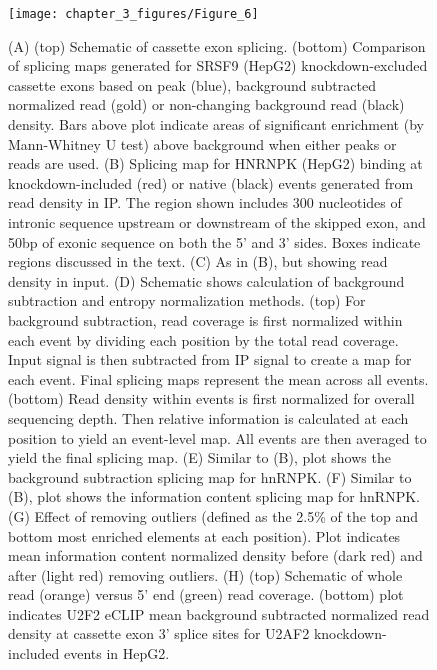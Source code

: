 \begin{figure}[ht]
  \centering
  \texttt{[image: chapter\_3\_figures/Figure\_6]}
  \caption[Figure 6. Considerations for design of splicing maps]{(A) (top) Schematic of cassette exon splicing. (bottom) Comparison of splicing maps generated for SRSF9 (HepG2) knockdown-excluded cassette exons based on peak (blue), background subtracted normalized read (gold) or non-changing background read (black) density. Bars above plot indicate areas of significant enrichment (by Mann-Whitney U test) above background when either peaks or reads are used. (B) Splicing map for HNRNPK (HepG2) binding at knockdown-included (red) or native (black) events generated from read density in IP. The region shown includes 300 nucleotides of intronic sequence upstream or downstream of the skipped exon, and 50bp of exonic sequence on both the 5’ and 3’ sides. Boxes indicate regions discussed in the text. (C) As in (B), but showing read density in input. (D) Schematic shows calculation of background subtraction and entropy normalization methods. (top) For background subtraction, read coverage is first normalized within each event by dividing each position by the total read coverage. Input signal is then subtracted from IP signal to create a map for each event. Final splicing maps represent the mean across all events. (bottom) Read density within events is first normalized for overall sequencing depth. Then relative information is calculated at each position to yield an event-level map. All events are then averaged to yield the final splicing map. (E) Similar to (B), plot shows the background subtraction splicing map for hnRNPK. (F) Similar to (B), plot shows the information content splicing map for hnRNPK. (G) Effect of removing outliers (defined as the 2.5\% of the top and bottom most enriched elements at each position). Plot indicates mean information content normalized density before (dark red) and after (light red) removing outliers. (H) (top) Schematic of whole read (orange) versus 5’ end (green) read coverage. (bottom) plot indicates U2F2 eCLIP mean background subtracted normalized read density at cassette exon 3’ splice sites for U2AF2 knockdown-included events in HepG2.}
  \label{fig:Figure_6}
\end{figure}


